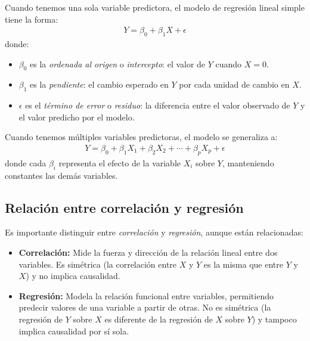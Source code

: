 \begin{definicion}
	Cuando tenemos una sola variable predictora, el modelo de regresión lineal simple tiene la forma:
	\begin{align}
		Y = \beta_0 + \beta_1 X + \epsilon
	\end{align}
	donde:
	\begin{itemize}
		\item $\beta_0$ es la \emph{ordenada al origen} o \emph{intercepto}: el valor de $Y$ cuando $X = 0$.
		\item $\beta_1$ es la \emph{pendiente}: el cambio esperado en $Y$ por cada unidad de cambio en $X$.
		\item $\epsilon$ es el \emph{término de error} o \emph{residuo}: la diferencia entre el valor observado de $Y$ y el valor predicho por el modelo.
	\end{itemize}
\end{definicion}

\begin{definicion}
	Cuando tenemos múltiples variables predictoras, el modelo se generaliza a:
	\begin{align}
		Y = \beta_0 + \beta_1 X_1 + \beta_2 X_2 + \cdots + \beta_p X_p + \epsilon
	\end{align}
	donde cada $\beta_i$ representa el efecto de la variable $X_i$ sobre $Y$, manteniendo constantes las demás variables.
\end{definicion}

\subsection{Relación entre correlación y regresión}

Es importante distinguir entre \emph{correlación} y \emph{regresión}, aunque están relacionadas:

\begin{itemize}
	\item \textbf{Correlación:} Mide la fuerza y dirección de la relación lineal entre dos variables. Es simétrica (la correlación entre $X$ y $Y$ es la misma que entre $Y$ y $X$) y no implica causalidad.
	
	\item \textbf{Regresión:} Modela la relación funcional entre variables, permitiendo predecir valores de una variable a partir de otras. No es simétrica (la regresión de $Y$ sobre $X$ es diferente de la regresión de $X$ sobre $Y$) y tampoco implica causalidad por sí sola.
\end{itemize}

